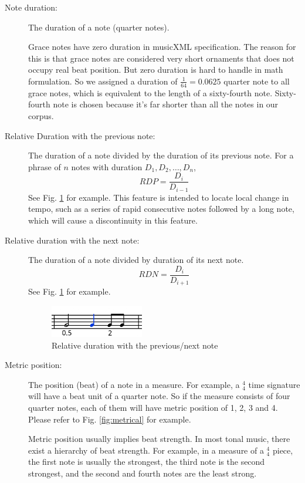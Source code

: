 \begin{description}
         
         \item [Note duration:] The duration of a note (quarter notes). 

            Grace notes have zero duration in musicXML specification. The reason for this is that grace notes are considered very short ornaments that does not occupy real beat position. But zero duration is hard to handle in math formulation. So we assigned a duration of $\frac{1}{64} = 0.0625$ quarter note to all grace notes, which is equivalent to the length of a sixty-fourth note. Sixty-fourth note is chosen because it's far shorter than all the notes in our corpus.
         \item [Relative Duration with the previous note:] The duration of a note divided by the duration of its previous note. For a phrase of $n$ notes with duration $D_1, D_2, \dots, D_n$, $$RDP = \frac{D_i}{D_{i-1}} $$ See Fig. \ref{fig:duration} for example.
            This feature is intended to locate local change in tempo, such as a series of rapid consecutive notes followed by a long note, which will cause a discontinuity in this feature.
         \item [Relative duration with the next note:] The duration of a note divided by duration of its next note. $$RDN = \frac{D_i}{D_{i+1}} $$ See Fig. \ref{fig:duration} for example.

      \begin{figure}[tp]
         \begin{center}
            \includegraphics[width=0.4\textwidth]{fig/duration}
         \end{center}
         \caption{Relative duration with the previous/next note}
         \label{fig:duration}
      \end{figure}
   \item [Metric position:] The position (beat) of a note in a measure. For example, a $^4_4$ time signature will have a beat unit of a quarter note. So if the measure consists of four quarter notes, each of them will have metric position of 1, 2, 3 and 4. Please refer to Fig. \ref{fig:metrical} for example.
      
      Metric position usually implies beat strength. In most tonal music, there exist a hierarchy of beat strength. For example, in a measure of a $^4_4$ piece, the first note is usually the strongest, the third note is the second strongest, and the second and fourth notes are the least strong.


\end{description}
